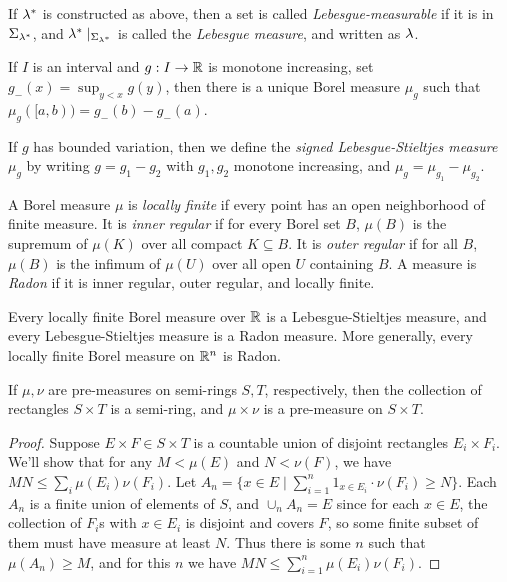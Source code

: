 \documentclass[letterpaper,11pt]{report}
\begin{document}
\begin{defn} If $\lambda^*$ is constructed as above, then a set is called \emph{Lebesgue-measurable} if it is in $\Sigma_{\lambda^*}$, and $\lambda^*\mid_{\Sigma_{\lambda^*}}$ is called the \emph{Lebesgue measure}, and written as $\lambda$.
\end{defn}

\begin{thm} If $I$ is an interval and $g: I \rightarrow \mathbb{R}$ is monotone increasing, set $g_-(x) = \sup_{y < x} g(y)$, then there is a unique Borel measure $\mu_g$ such that $\mu_g([a,b)) = g_-(b) - g_-(a)$.
\end{thm}

\begin{defn} If $g$ has bounded variation, then we define the \emph{signed Lebesgue-Stieltjes measure} $\mu_g$ by writing $g = g_1 - g_2$ with $g_1, g_2$ monotone increasing, and $\mu_g = \mu_{g_1} - \mu_{g_2}$.
\end{defn}

\begin{defn} A Borel measure $\mu$ is \emph{locally finite} if every point has an open neighborhood of finite measure. It is \emph{inner regular} if for every Borel set $B$, $\mu(B)$ is the supremum of $\mu(K)$ over all compact $K \subseteq B$. It is \emph{outer regular} if for all $B$, $\mu(B)$ is the infimum of $\mu(U)$ over all open $U$ containing $B$. A measure is \emph{Radon} if it is inner regular, outer regular, and locally finite.
\end{defn}

\begin{prop} Every locally finite Borel measure over $\mathbb{R}$ is a Lebesgue-Stieltjes measure, and every Lebesgue-Stieltjes measure is a Radon measure. More generally, every locally finite Borel measure on $\mathbb{R}^n$ is Radon.
\end{prop}

\begin{thm}\label{product-measure} If $\mu, \nu$ are pre-measures on semi-rings $S,T$, respectively, then the collection of rectangles $S\times T$ is a semi-ring, and $\mu\times \nu$ is a pre-measure on $S\times T$.
\end{thm}
\begin{proof} Suppose $E\times F \in S\times T$ is a countable union of disjoint rectangles $E_i \times F_i$. We'll show that for any $M < \mu(E)$ and $N < \nu(F)$, we have $MN \le \sum_i \mu(E_i)\nu(F_i)$. Let $A_n = \{x \in E \mid \sum_{i=1}^n 1_{x \in E_i}\cdot\nu(F_i) \ge N\}$. Each $A_n$ is a finite union of elements of $S$, and $\cup_n A_n = E$ since for each $x \in E$, the collection of $F_i$s with $x \in E_i$ is disjoint and covers $F$, so some finite subset of them must have measure at least $N$. Thus there is some $n$ such that $\mu(A_n) \ge M$, and for this $n$ we have $MN \le \sum_{i=1}^n \mu(E_i)\nu(F_i)$.
\end{proof}
\end{document}
